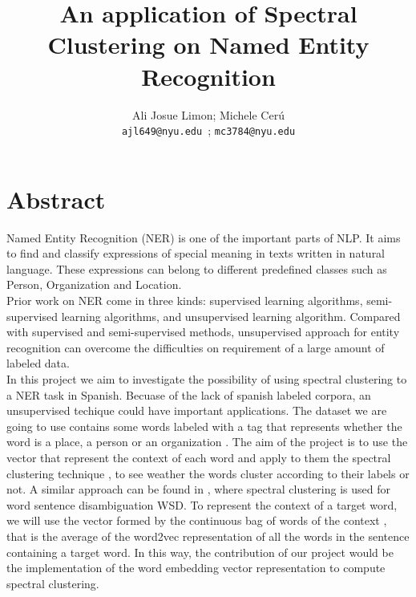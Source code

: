 \documentclass[]{article}
\title{An application of Spectral Clustering on Named Entity Recognition}
\author{Ali Josue Limon; Michele Cer\'u \\ 
\texttt{ajl649@nyu.edu }; \texttt{mc3784@nyu.edu}
}
\begin{document}
\maketitle
\newcommand{\slugmaster}{%
\slugger{siads}{xxxx}{xx}{x}{x---x}}%



\section{Abstract}

Named Entity Recognition (NER) is one of the important parts of NLP. It aims to find and classify expressions of special meaning in texts written in natural language.  These expressions can belong to different predefined classes such as Person, Organization and Location. \\

Prior work on NER come in three kinds: supervised learning algorithms, semi-supervised learning algorithms, and unsupervised learning algorithm. Compared with supervised and semi-supervised methods, unsupervised approach for entity recognition can overcome the difficulties on requirement of a large amount of labeled data. \\

In this project we aim to investigate the possibility of using spectral clustering \cite{spectral}  to a NER task in Spanish. Becuase of the lack of spanish labeled corpora, an unsupervised techique could have important applications. The dataset we are going to use contains some words labeled with a tag that represents whether the word is a place, a person or an organization \cite{dataset}. The aim of the project is to use the vector that represent the context of each word and apply to them the spectral clustering technique \cite{spectral}, to see weather the words cluster according to their labels or not. A similar approach can be found in \cite{popescu}, where spectral clustering is used for word sentence disambiguation WSD. To represent the context of a target word, we will use the vector formed by the continuous bag of words of the context \cite{vecSp}, that is the average of the word2vec \cite{word2vec} representation of all the words in the sentence containing a target word. In this way, the contribution of our project would be the implementation of the word embedding vector representation to compute spectral clustering. \\
  
\end{document}
